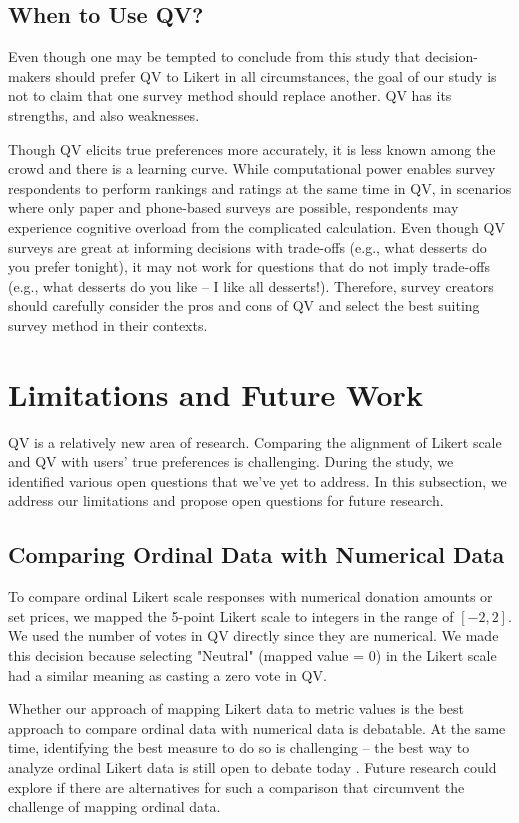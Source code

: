 \subsection{When to Use QV?}
Even though one may be tempted to conclude from this study that decision-makers should prefer QV to Likert in all circumstances, the goal of our study is not to claim that one survey method should replace another. QV has its strengths, and also weaknesses. 

Though QV elicits true preferences more accurately, it is less known among the crowd and there is a learning curve. While computational power enables survey respondents to perform rankings and ratings at the same time in QV, in scenarios where only paper and phone-based surveys are possible, respondents may experience cognitive overload from the complicated calculation. Even though QV surveys are great at informing decisions with trade-offs (e.g., what desserts do you prefer tonight), it may not work for questions that do not imply trade-offs (e.g., what desserts do you like -- I like all desserts!). Therefore, survey creators should carefully consider the pros and cons of QV and select the best suiting survey method in their contexts.

\section{Limitations and Future Work}
QV is a relatively new area of research. Comparing the alignment of Likert scale and QV with users' true preferences is challenging. During the study, we identified various open questions that we've yet to address. In this subsection, we address our limitations and propose open questions for future research. 


\subsection{Comparing Ordinal Data with Numerical Data}
To compare ordinal Likert scale responses with numerical donation amounts or set prices, we mapped the 5-point Likert scale to integers in the range of $[-2, 2]$. We used the number of votes in QV directly since they are numerical. We made this decision because selecting "Neutral" (mapped value = 0) in the Likert scale had a similar meaning as casting a zero vote in QV.

Whether our approach of mapping Likert data to metric values is the best approach to compare ordinal data with numerical data is debatable. At the same time, identifying the best measure to do so is challenging -- the best way to analyze ordinal Likert data is still open to debate today \cite{gob2007ordinal}. Future research could explore if there are alternatives for such a comparison that circumvent the challenge of mapping ordinal data. 

